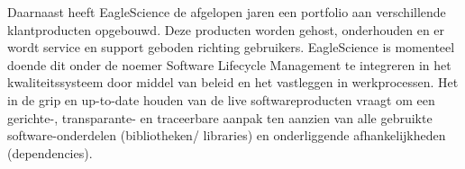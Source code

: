 Daarnaast heeft EagleScience de afgelopen jaren een portfolio aan verschillende klantproducten opgebouwd. Deze producten worden gehost, onderhouden en er wordt service en support geboden richting gebruikers. EagleScience is momenteel doende dit onder de noemer Software Lifecycle Management te integreren in het kwaliteitssysteem door middel van beleid en het vastleggen in werkprocessen. Het in de grip en up-to-date houden van de live softwareproducten vraagt om een gerichte-, transparante- en traceerbare aanpak ten aanzien van alle gebruikte software-onderdelen (bibliotheken/ libraries) en onderliggende afhankelijkheden (dependencies).



